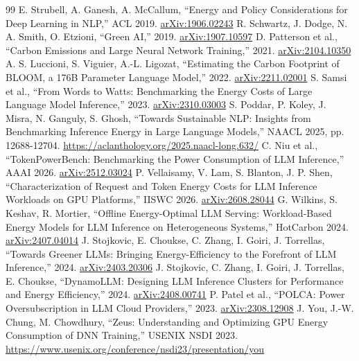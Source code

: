 \clearpage{}
{}
\begin{thebibliography}{99}
 E. Strubell, A. Ganesh, A. McCallum, ``Energy and Policy Considerations for Deep Learning in NLP,'' ACL 2019. \href{https://arxiv.org/abs/1906.02243}{arXiv:1906.02243}
 R. Schwartz, J. Dodge, N. A. Smith, O. Etzioni, ``Green AI,'' 2019. \href{https://arxiv.org/abs/1907.10597}{arXiv:1907.10597}
 D. Patterson et al., ``Carbon Emissions and Large Neural Network Training,'' 2021. \href{https://arxiv.org/abs/2104.10350}{arXiv:2104.10350}
 A. S. Luccioni, S. Viguier, A.-L. Ligozat, ``Estimating the Carbon Footprint of BLOOM, a 176B Parameter Language Model,'' 2022. \href{https://arxiv.org/abs/2211.02001}{arXiv:2211.02001}
 S. Samsi et al., ``From Words to Watts: Benchmarking the Energy Costs of Large Language Model Inference,'' 2023. \href{https://arxiv.org/abs/2310.03003}{arXiv:2310.03003}
 S. Poddar, P. Koley, J. Misra, N. Ganguly, S. Ghosh, ``Towards Sustainable NLP: Insights from Benchmarking Inference Energy in Large Language Models,'' NAACL 2025, pp. 12688-12704. \url{https://aclanthology.org/2025.naacl-long.632/}
 C. Niu et al., ``TokenPowerBench: Benchmarking the Power Consumption of LLM Inference,'' AAAI 2026. \href{https://arxiv.org/abs/2512.03024}{arXiv:2512.03024}
 P. Vellaisamy, V. Lam, S. Blanton, J. P. Shen, ``Characterization of Request and Token Energy Costs for LLM Inference Workloads on GPU Platforms,'' IISWC 2026. \href{https://arxiv.org/abs/2608.28044}{arXiv:2608.28044}
 G. Wilkins, S. Keshav, R. Mortier, ``Offline Energy-Optimal LLM Serving: Workload-Based Energy Models for LLM Inference on Heterogeneous Systems,'' HotCarbon 2024. \href{https://arxiv.org/abs/2407.04014}{arXiv:2407.04014}
 J. Stojkovic, E. Choukse, C. Zhang, I. Goiri, J. Torrellas, ``Towards Greener LLMs: Bringing Energy-Efficiency to the Forefront of LLM Inference,'' 2024. \href{https://arxiv.org/abs/2403.20306}{arXiv:2403.20306}
 J. Stojkovic, C. Zhang, I. Goiri, J. Torrellas, E. Choukse, ``DynamoLLM: Designing LLM Inference Clusters for Performance and Energy Efficiency,'' 2024. \href{https://arxiv.org/abs/2408.00741}{arXiv:2408.00741}
 P. Patel et al., ``POLCA: Power Oversubscription in LLM Cloud Providers,'' 2023. \href{https://arxiv.org/abs/2308.12908}{arXiv:2308.12908}
 J. You, J.-W. Chung, M. Chowdhury, ``Zeus: Understanding and Optimizing GPU Energy Consumption of DNN Training,'' USENIX NSDI 2023. \url{https://www.usenix.org/conference/nsdi23/presentation/you}

\end{thebibliography}
